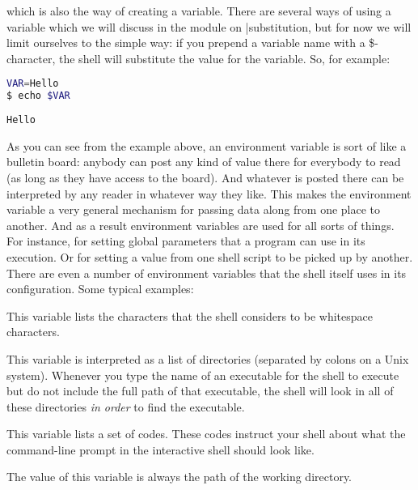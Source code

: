 which is also the way of creating a variable. There are several ways of using a
variable which we will discuss in the module on |substitution, but for now we
will limit ourselves to the simple way: if you prepend a variable name with a
\$-character, the shell will substitute the value for the variable. So, for
example:
\lstset{basicstyle=\scriptsize, numbers=left, captionpos=b, tabsize=4}
\begin{lstlisting}[caption=Simple use of a variable,language={bash},
xleftmargin=15pt, label=lst:simpleuseofavariable]
VAR=Hello
$ echo $VAR
\end{lstlisting}
\scriptsize
\begin{verbatim}
Hello
\end{verbatim}
\normalsize
As you can see from the example above, an environment variable is sort of like
a bulletin board: anybody can post any kind of value there for everybody to
read (as long as they have access to the board). And whatever is posted there
can be interpreted by any reader in whatever way they like. This makes the
environment variable a very general mechanism for passing data along from one
place to another. And as a result environment variables are used for all sorts
of things. For instance, for setting global parameters that a program can use
in its execution. Or for setting a value from one shell script to be picked up
by another. There are even a number of environment variables that the shell
itself uses in its configuration. Some typical examples:

\begin{description}
\setlength{\leftmargin}{0pt}
\setlength{\itemsep}{0pt}
\setlength{\parsep}{0pt}
\setlength{\parskip}{0pt}
\item[IFS]This variable lists the characters that the shell considers to be whitespace characters.
\item[PATH]This variable is interpreted as a list of directories (separated by colons on a Unix system). Whenever you type the name of an executable for the shell to execute but do not include the full path of that executable, the shell will look in all of these directories \textit{in order} to find the executable.
\item[PS1]This variable lists a set of codes. These codes instruct your shell about what the command-line prompt in the interactive shell should look like.
\item[PWD]The value of this variable is always the path of the working directory.
\end{description}


